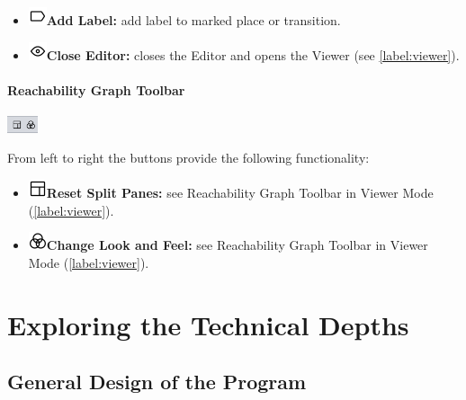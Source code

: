 \documentclass[10pt, a4paper]{article}
\begin{document}
\begin{itemize}
\item\includegraphics[scale=0.4]{../resources/images/Toolbar/label.png}\hspace{0.1cm}\textbf{Add Label:} add label to marked place or transition.
\item\includegraphics[scale=0.4]{../resources/images/Toolbar/eye.png}\hspace{0.1cm}\textbf{Close Editor:} closes the Editor and opens the Viewer (see \ref{label:viewer}).
\end{itemize}


\paragraph{Reachability Graph Toolbar}

\includegraphics[height=0.5cm]{Editor_Reachability.png}

From left to right the buttons provide the following functionality:
\begin{itemize}
\item\includegraphics[scale=0.4]{../resources/images/Toolbar/layout.png}\hspace{0.1cm}\textbf{Reset Split Panes:} see Reachability Graph Toolbar in Viewer Mode (\ref{label:viewer}).
\item\includegraphics[scale=0.4]{../resources/images/Toolbar/design.png}\hspace{0.1cm}\textbf{Change Look and Feel:} see Reachability Graph Toolbar in Viewer Mode (\ref{label:viewer}).
\end{itemize}

\section{Exploring the Technical Depths}


\subsection{General Design of the Program}
\end{document}
